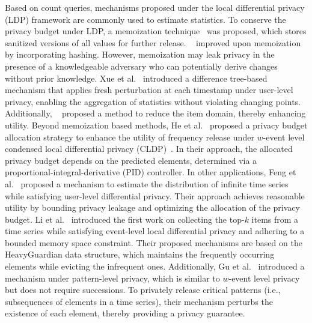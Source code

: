 Based on count queries, mechanisms proposed under the local differential privacy (LDP) framework are commonly used to estimate statistics. 
To conserve the privacy budget under LDP, a memoization technique~\cite{erlingsson2014rappor} was proposed, which stores sanitized versions of all values for further release. ~\cite{ding2017collecting} improved upon memoization by incorporating hashing. However, memoization may leak privacy in the presence of a knowledgeable adversary who can potentially derive changes without prior knowledge. Xue et al.~\cite{xue2022ddrm} introduced a difference tree-based mechanism that applies fresh perturbation at each timestamp under user-level privacy, enabling the aggregation of statistics without violating changing points. Additionally, ~\cite{arcolezi2022frequency} proposed a method to reduce the item domain, thereby enhancing utility. 
Beyond memoization based methods, He et al.~\cite{he2022ordinal} proposed a privacy budget allocation strategy to enhance the utility of frequency release under $w$-event level condensed local differential privacy (CLDP)~\cite{gursoy2019secure}. In their approach, the allocated privacy budget depends on the predicted elements, determined via a proportional-integral-derivative (PID) controller.
In other applications, 
Feng et al.~\cite{feng2023dpi} proposed a mechanism to estimate the distribution of infinite time series while satisfying user-level differential privacy. Their approach achieves reasonable utility by bounding privacy leakage and optimizing the allocation of the privacy budget.
Li et al.~\cite{li2024local} introduced the first work on collecting the top-$k$ items from a time series while satisfying event-level local differential privacy and adhering to a bounded memory space constraint. Their proposed mechanisms are based on the HeavyGuardian data structure, which maintains the frequently occurring elements while evicting the infrequent ones.
Additionally, Gu et al.~\cite{gu2023differential} introduced a mechanism under pattern-level privacy, which is similar to $w$-event level privacy but does not require successions. To privately release critical patterns (i.e., subsequences of elements in a time series), their mechanism perturbs the existence of each element, thereby providing a privacy guarantee.





